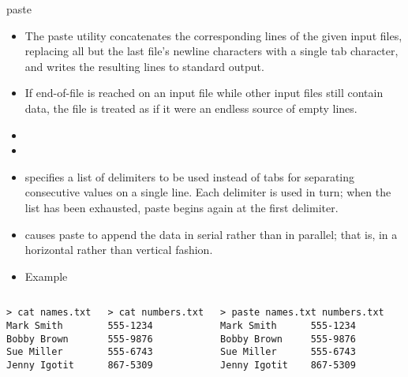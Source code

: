 \documentclass[10pt,t]{beamer}
\begin{document}
\begin{frame}[c,fragile]{paste}
  \begin{itemize}
    \item The paste utility concatenates the corresponding lines of the given input files, replacing all but the last file's newline characters with
     a single tab character, and writes the resulting lines to standard output.  
   \item[] If end-of-file is reached on an input file while other input
     files still contain data, the file is treated as if it were an endless source of empty lines.
   \item {} 
   \item {}
   \item[] specifies a list of delimiters to be used instead of tabs for separating consecutive values on a single line. Each delimiter is used in turn; when the list has been exhausted, paste begins again at the first delimiter.
   \item[] causes paste to append the data in serial rather than in parallel; that is, in a horizontal rather than vertical fashion.
   \item Example
  \end{itemize}
  \begin{columns}
    \vspace{-0.5cm}
    \begin{lstlisting}[style=LINUX]
> cat names.txt
Mark Smith
Bobby Brown
Sue Miller
Jenny Igotit
    \end{lstlisting}
    \vspace{-0.5cm}
    \begin{lstlisting}[style=LINUX]
> cat numbers.txt
555-1234
555-9876
555-6743
867-5309
    \end{lstlisting}
    \vspace{-0.5cm}
    \begin{lstlisting}[style=LINUX]
> paste names.txt numbers.txt
Mark Smith      555-1234
Bobby Brown     555-9876
Sue Miller      555-6743
Jenny Igotit    867-5309
    \end{lstlisting}
  \end{columns}
\end{frame}
\end{document}
